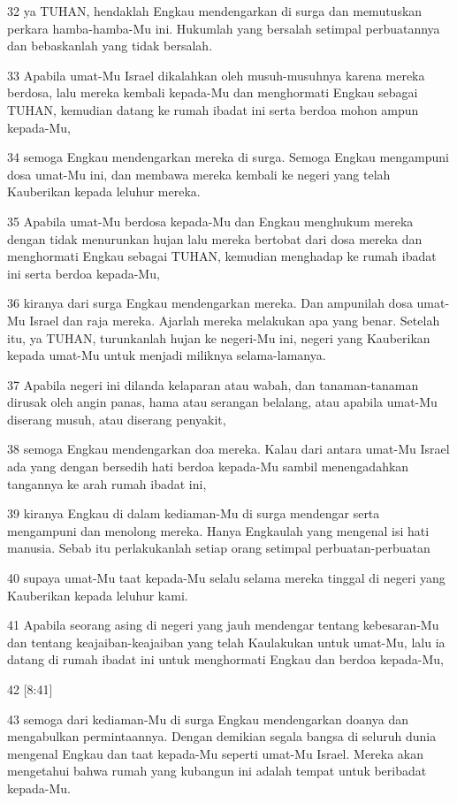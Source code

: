 \par 32 ya TUHAN, hendaklah Engkau mendengarkan di surga dan memutuskan perkara hamba-hamba-Mu ini. Hukumlah yang bersalah setimpal perbuatannya dan bebaskanlah yang tidak bersalah.
\par 33 Apabila umat-Mu Israel dikalahkan oleh musuh-musuhnya karena mereka berdosa, lalu mereka kembali kepada-Mu dan menghormati Engkau sebagai TUHAN, kemudian datang ke rumah ibadat ini serta berdoa mohon ampun kepada-Mu,
\par 34 semoga Engkau mendengarkan mereka di surga. Semoga Engkau mengampuni dosa umat-Mu ini, dan membawa mereka kembali ke negeri yang telah Kauberikan kepada leluhur mereka.
\par 35 Apabila umat-Mu berdosa kepada-Mu dan Engkau menghukum mereka dengan tidak menurunkan hujan lalu mereka bertobat dari dosa mereka dan menghormati Engkau sebagai TUHAN, kemudian menghadap ke rumah ibadat ini serta berdoa kepada-Mu,
\par 36 kiranya dari surga Engkau mendengarkan mereka. Dan ampunilah dosa umat-Mu Israel dan raja mereka. Ajarlah mereka melakukan apa yang benar. Setelah itu, ya TUHAN, turunkanlah hujan ke negeri-Mu ini, negeri yang Kauberikan kepada umat-Mu untuk menjadi miliknya selama-lamanya.
\par 37 Apabila negeri ini dilanda kelaparan atau wabah, dan tanaman-tanaman dirusak oleh angin panas, hama atau serangan belalang, atau apabila umat-Mu diserang musuh, atau diserang penyakit,
\par 38 semoga Engkau mendengarkan doa mereka. Kalau dari antara umat-Mu Israel ada yang dengan bersedih hati berdoa kepada-Mu sambil menengadahkan tangannya ke arah rumah ibadat ini,
\par 39 kiranya Engkau di dalam kediaman-Mu di surga mendengar serta mengampuni dan menolong mereka. Hanya Engkaulah yang mengenal isi hati manusia. Sebab itu perlakukanlah setiap orang setimpal perbuatan-perbuatan
\par 40 supaya umat-Mu taat kepada-Mu selalu selama mereka tinggal di negeri yang Kauberikan kepada leluhur kami.
\par 41 Apabila seorang asing di negeri yang jauh mendengar tentang kebesaran-Mu dan tentang keajaiban-keajaiban yang telah Kaulakukan untuk umat-Mu, lalu ia datang di rumah ibadat ini untuk menghormati Engkau dan berdoa kepada-Mu,
\par 42 [8:41]
\par 43 semoga dari kediaman-Mu di surga Engkau mendengarkan doanya dan mengabulkan permintaannya. Dengan demikian segala bangsa di seluruh dunia mengenal Engkau dan taat kepada-Mu seperti umat-Mu Israel. Mereka akan mengetahui bahwa rumah yang kubangun ini adalah tempat untuk beribadat kepada-Mu.
